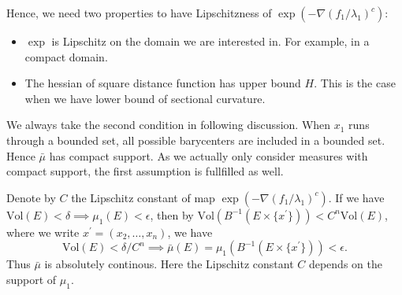 Hence, we need two properties to have Lipschitzness of $\exp(-\nabla (f_1 / \lambda_1)^c)$:
\begin{itemize}
	\item $ \exp $ is Lipschitz on the domain we are interested in.
	      For example, in a compact domain.
	\item The hessian of square distance function has upper bound $H$.
	      This is the case when we have lower bound of sectional curvature.
\end{itemize}

We always take the second condition in following discussion.
When $x_1$ runs through a bounded set,
all possible barycenters are included in a bounded set.
Hence $\bar{\mu}$ has compact support.
As we actually only consider measures with compact support, the first assumption is fullfilled as well.


Denote by $C$ the Lipschitz constant of map \(\exp(-\nabla(f_1/\lambda_1)^c)\).
If we have $ \text{Vol}(E) < \delta \implies \mu_1(E) < \epsilon$,
then by $\text{Vol}(B^{-1}( E\times \{x^\prime\})) < C^n \text{Vol}(E)$,
where we write $x^\prime = (x_2, \ldots, x_n)$,
we have
\begin{equation}
	\label{equa:absolutely_continuity_estimation}
	\text{Vol}(E) < \delta / C^n \implies \bar{\mu}(E)=\mu_1(B^{-1}(E \times \{x^\prime\})) < \epsilon.
\end{equation}
Thus $\bar{\mu}$ is absolutely continous.
Here the Lipschitz constant $C$ depends on the support of $\mu_1$.


